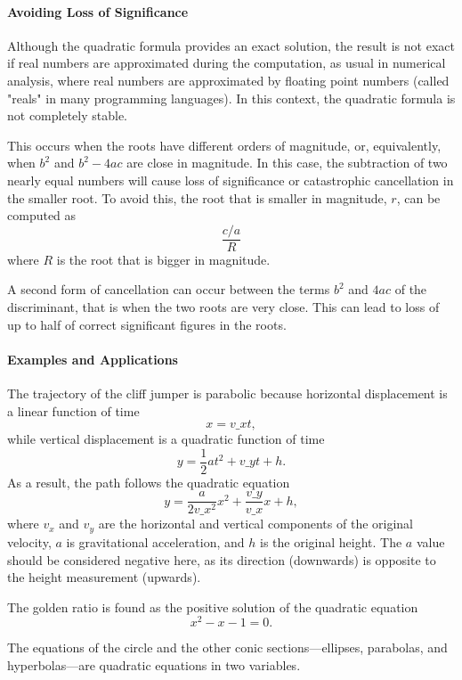 \paragraph{Avoiding Loss of Significance}

Although the quadratic formula provides an exact solution, the result is not exact if real numbers are approximated during the computation, as usual in numerical analysis, where real numbers are approximated by floating point numbers (called "reals" in many programming languages). In this context, the quadratic formula is not completely stable.

This occurs when the roots have different orders of magnitude, or, equivalently, when $b^2$ and $b^2 - 4ac$ are close in magnitude. In this case, the subtraction of two nearly equal numbers will cause loss of significance or catastrophic cancellation in the smaller root. To avoid this, the root that is smaller in magnitude, $r$, can be computed as 
$$\frac{c / a}{R}$$ 
where $R$ is the root that is bigger in magnitude.

A second form of cancellation can occur between the terms $b^2$ and $4ac$ of the discriminant, that is when the two roots are very close. This can lead to loss of up to half of correct significant figures in the roots.

\paragraph{Examples and Applications}


The trajectory of the cliff jumper is parabolic because horizontal displacement is a linear function of time
$$x = v\_x t,$$
while vertical displacement is a quadratic function of time
$$y = \frac{1}{2} a t^2 + v\_y t + h.$$ 
As a result, the path follows the quadratic equation
$$y = \frac{a}{2v\_x^2} x^2 + \frac{v\_y}{v\_x} x + h,$$
where $v_x$ and $v_y$ are the horizontal and vertical components of the original velocity, $a$ is gravitational acceleration, and $h$ is the original height. The $a$ value should be considered negative here, as its direction (downwards) is opposite to the height measurement (upwards).

The golden ratio is found as the positive solution of the quadratic equation
$$x^2 - x - 1 = 0.$$

The equations of the circle and the other conic sections—ellipses, parabolas, and hyperbolas—are quadratic equations in two variables.

